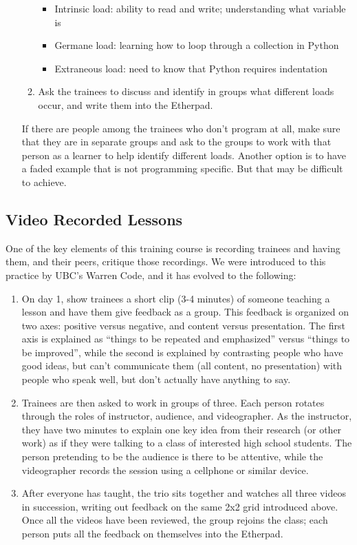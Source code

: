 \begin{itemize}
\begin{enumerate}
    \begin{itemize}
        \item
      Intrinsic load: ability to read and write; understanding what
      variable is
    \item
      Germane load: learning how to loop through a collection in Python
    \item
      Extraneous load: need to know that Python requires indentation
    \end{itemize}
  \item
    Ask the trainees to discuss and identify in groups what different
    loads occur, and write them into the Etherpad.
  \end{enumerate}

  If there are people among the trainees who don't program at all, make
  sure that they are in separate groups and ask to the groups to work
  with that person as a learner to help identify different loads.
  Another option is to have a faded example that is not programming
  specific. But that may be difficult to achieve.
\end{itemize}

\subsection{Video Recorded Lessons}\label{video-recorded-lessons}

One of the key elements of this training course is recording trainees
and having them, and their peers, critique those recordings. We were
introduced to this practice by UBC's Warren Code, and it has evolved to
the following:

\begin{enumerate}
\item
  On day 1, show trainees a short clip (3-4 minutes) of someone teaching
  a lesson and have them give feedback as a group. This feedback is
  organized on two axes: positive versus negative, and content versus
  presentation. The first axis is explained as ``things to be repeated
  and emphasized'' versus ``things to be improved'', while the second is
  explained by contrasting people who have good ideas, but can't
  communicate them (all content, no presentation) with people who speak
  well, but don't actually have anything to say.
\item
  Trainees are then asked to work in groups of three. Each person
  rotates through the roles of instructor, audience, and videographer.
  As the instructor, they have two minutes to explain one key idea from
  their research (or other work) as if they were talking to a class of
  interested high school students. The person pretending to be the
  audience is there to be attentive, while the videographer records the
  session using a cellphone or similar device.
\item
  After everyone has taught, the trio sits together and watches all
  three videos in succession, writing out feedback on the same 2x2 grid
  introduced above. Once all the videos have been reviewed, the group
  rejoins the class; each person puts all the feedback on themselves
  into the Etherpad.
\end{enumerate}

